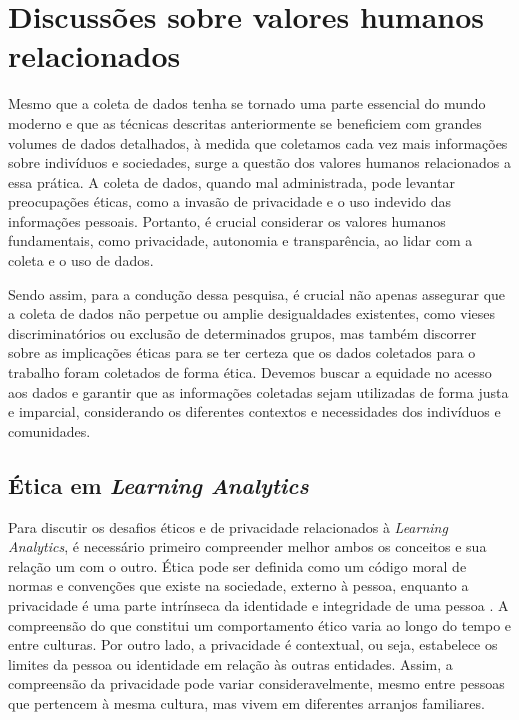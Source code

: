 \section{Discussões sobre valores humanos relacionados}

Mesmo que a coleta de dados %
tenha se tornado uma parte essencial do mundo moderno e que as técnicas descritas anteriormente se %
beneficiem com grandes volumes de dados detalhados, à medida que coletamos cada vez mais informações sobre indivíduos e sociedades, surge a questão dos valores humanos relacionados a essa prática. A coleta de dados, quando mal administrada, pode levantar preocupações éticas, como a invasão de privacidade e o uso indevido das informações pessoais. Portanto, é crucial considerar os valores humanos fundamentais, como privacidade, autonomia e transparência, ao lidar com a coleta e o uso de dados.

Sendo assim, para a condução dessa pesquisa, é crucial não apenas assegurar que a coleta de dados não perpetue ou amplie desigualdades existentes, como vieses discriminatórios ou exclusão de determinados grupos, mas também discorrer sobre as implicações éticas para se ter certeza que os dados coletados para o trabalho foram coletados de forma ética. Devemos buscar a equidade no acesso aos dados e garantir que as informações coletadas sejam utilizadas de forma justa e imparcial, considerando os diferentes contextos e necessidades dos indivíduos e comunidades.

\subsection{Ética em \textit{Learning Analytics}}

Para discutir os desafios éticos e de privacidade relacionados à \textit{Learning Analytics}, é necessário primeiro compreender melhor ambos os conceitos e sua relação um com o outro. Ética pode ser definida como um código moral de normas e convenções que existe na sociedade, externo à pessoa, enquanto a privacidade é uma parte intrínseca da identidade e integridade de uma pessoa \cite{Drachsler2016}. A compreensão do que constitui um comportamento ético varia ao longo do tempo e entre culturas. Por outro lado, a privacidade é contextual, ou seja, estabelece os limites da pessoa ou identidade em relação às outras entidades. Assim, a compreensão da privacidade pode variar consideravelmente, mesmo entre pessoas que pertencem à mesma cultura, mas vivem em diferentes arranjos familiares.

